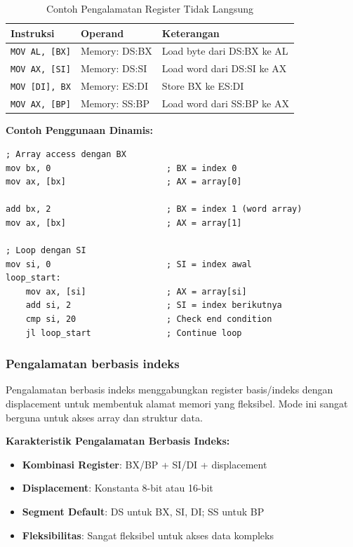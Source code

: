 \begin{table}[h]
\centering
\caption{Contoh Pengalamatan Register Tidak Langsung}
\begin{tabular}{|p{4cm}|p{4cm}|p{7cm}|}
\hline
\textbf{Instruksi} & \textbf{Operand} & \textbf{Keterangan} \\
\hline
\texttt{MOV AL, [BX]} & Memory: DS:BX & Load byte dari DS:BX ke AL \\
\hline
\texttt{MOV AX, [SI]} & Memory: DS:SI & Load word dari DS:SI ke AX \\
\hline
\texttt{MOV [DI], BX} & Memory: ES:DI & Store BX ke ES:DI \\
\hline
\texttt{MOV AX, [BP]} & Memory: SS:BP & Load word dari SS:BP ke AX \\
\hline
\end{tabular}
\label{tab:indirect-register-addressing-examples}
\end{table}

\textbf{Contoh Penggunaan Dinamis:}
\begin{lstlisting}[language={[x86masm]Assembler}, caption=Penggunaan Dinamis Register untuk Array Access, label=lst:dynamic-usage]
; Array access dengan BX
mov bx, 0                       ; BX = index 0
mov ax, [bx]                    ; AX = array[0]

add bx, 2                       ; BX = index 1 (word array)
mov ax, [bx]                    ; AX = array[1]

; Loop dengan SI
mov si, 0                       ; SI = index awal
loop_start:
    mov ax, [si]                ; AX = array[si]
    add si, 2                   ; SI = index berikutnya
    cmp si, 20                  ; Check end condition
    jl loop_start               ; Continue loop
\end{lstlisting}

\subsubsection{Pengalamatan berbasis indeks}
Pengalamatan berbasis indeks menggabungkan register basis/indeks dengan displacement untuk membentuk alamat memori yang fleksibel. Mode ini sangat berguna untuk akses array dan struktur data.

\textbf{Karakteristik Pengalamatan Berbasis Indeks:}
\begin{itemize}
    \item \textbf{Kombinasi Register}: BX/BP + SI/DI + displacement
    \item \textbf{Displacement}: Konstanta 8-bit atau 16-bit
    \item \textbf{Segment Default}: DS untuk BX, SI, DI; SS untuk BP
    \item \textbf{Fleksibilitas}: Sangat fleksibel untuk akses data kompleks
\end{itemize}


